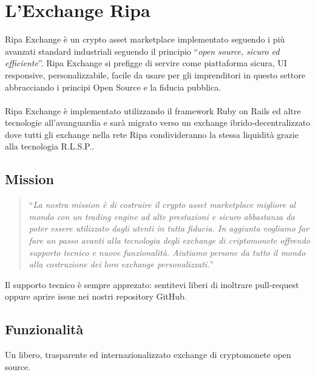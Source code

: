 \documentclass[11pt,fleqn,oneside]{book} %
\begin{document}


\chapter{L'Exchange Ripa}
Ripa Exchange è un crypto asset marketplace implementato seguendo i più avanzati standard industriali seguendo il principio
``\textit{open source, sicuro ed efficiente}''. Ripa Exchange si prefigge di servire come piattaforma sicura, UI responsive, 
personalizzabile, facile da usare per gli imprenditori in questo settore abbracciando i principi Open Source e la fiducia pubblica.\\\\
Ripa Exchange è implementato utilizzando il framework Ruby on Rails ed altre tecnologie all'avanguardia e sarà migrato verso
un exchange ibrido-decentralizzato dove tutti gli exchange nella rete Ripa condivideranno la stessa liquidità grazie alla tecnologia R.L.S.P..

\section{Mission}
\begin{quotation}
	``\textit{La nostra mission è di costruire il crypto asset marketplace migliore al mondo con un trading engine ad alte prestazioni 
	e sicuro abbastanza da poter essere utilizzato dagli utenti in tutta fiducia. In aggiunta vogliamo far fare un passo avanti 
	alla tecnologia degli exchange di criptomonete offrendo supporto tecnico e nuove funzionalità. Aiutiamo persone da tutto il mondo
	alla costruzione dei loro exchange personalizzati.}''
\end{quotation}

Il supporto tecnico è sempre apprezato: sentitevi liberi di inoltrare pull-request oppure aprire issue nei nostri repository GitHub.

\section{Funzionalità}
Un libero, trasparente ed internazionalizzato exchange di cryptomonete open source.\\
\end{document}
